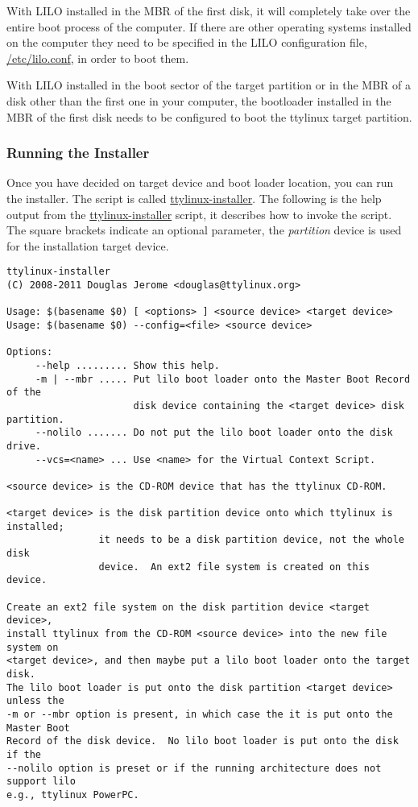 \documentclass[10pt]{article}
\begin{document}
With LILO installed in the MBR of the first disk, it will completely take over
the entire boot process of the computer. If there are other operating systems
installed on the computer they need to be specified in the LILO configuration
file, \url{/etc/lilo.conf}, in order to boot them.

With LILO installed in the boot sector of the target partition or in the MBR of
a disk other than the first one in your computer, the bootloader installed in
the MBR of the first disk needs to be configured to boot the ttylinux target
partition.

\subsubsection{Running the Installer}

Once you have decided on target device and boot loader location, you can run
the installer. The script is called \url{ttylinux-installer}. The following is
the help output from the \url{ttylinux-installer} script, it describes how to
invoke the script. The square brackets indicate an optional parameter, the
{\it partition} device is used for the installation target device.

\begin{lstlisting}
ttylinux-installer
(C) 2008-2011 Douglas Jerome <douglas@ttylinux.org>

Usage: $(basename $0) [ <options> ] <source device> <target device>
Usage: $(basename $0) --config=<file> <source device>

Options:
     --help ......... Show this help.
     -m | --mbr ..... Put lilo boot loader onto the Master Boot Record of the
                      disk device containing the <target device> disk partition.
     --nolilo ....... Do not put the lilo boot loader onto the disk drive.
     --vcs=<name> ... Use <name> for the Virtual Context Script.

<source device> is the CD-ROM device that has the ttylinux CD-ROM.

<target device> is the disk partition device onto which ttylinux is installed;
                it needs to be a disk partition device, not the whole disk
                device.  An ext2 file system is created on this device.

Create an ext2 file system on the disk partition device <target device>,
install ttylinux from the CD-ROM <source device> into the new file system on
<target device>, and then maybe put a lilo boot loader onto the target disk.
The lilo boot loader is put onto the disk partition <target device> unless the
-m or --mbr option is present, in which case the it is put onto the Master Boot
Record of the disk device.  No lilo boot loader is put onto the disk if the
--nolilo option is preset or if the running architecture does not support lilo
e.g., ttylinux PowerPC.
\end{lstlisting}
\end{document}
